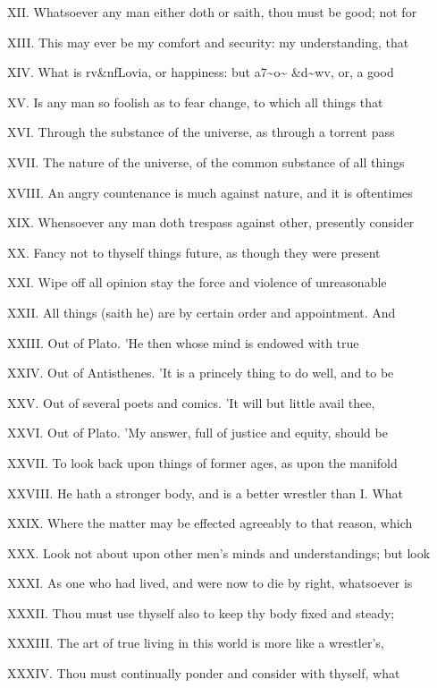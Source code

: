 XII. Whatsoever any man either doth or saith,
thou must be good; not for

XIII. This may ever be my comfort and
security: my understanding, that

XIV. What is rv\&nfLovia, or happiness: but
a7\textasciitilde{}o\textasciitilde{} \&d\textasciitilde{}wv, or, a good

XV. Is any man so foolish as to fear change,
to which all things that

XVI. Through the substance of the universe, as
through a torrent pass

XVII. The nature of the universe, of the
common substance of all things

XVIII. An angry countenance is much against
nature, and it is oftentimes

XIX. Whensoever any man doth trespass against
other, presently consider

XX. Fancy not to thyself things future, as
though they were present

XXI. Wipe off all opinion stay the force and
violence of unreasonable

XXII. All things (saith he) are by certain
order and appointment. And

XXIII. Out of Plato. 'He then whose mind is
endowed with true

XXIV. Out of Antisthenes. 'It is a princely
thing to do well, and to be

XXV. Out of several poets and comics. 'It will
but little avail thee,

XXVI. Out of Plato. 'My answer, full of
justice and equity, should be

XXVII. To look back upon things of former
ages, as upon the manifold

XXVIII. He hath a stronger body, and is a
better wrestler than I. What

XXIX. Where the matter may be effected
agreeably to that reason, which

XXX. Look not about upon other men's minds and
understandings; but look

XXXI. As one who had lived, and were now to
die by right, whatsoever is

XXXII. Thou must use thyself also to keep thy
body fixed and steady;

XXXIII. The art of true living in this world
is more like a wrestler's,

XXXIV. Thou must continually ponder and
consider with thyself, what


